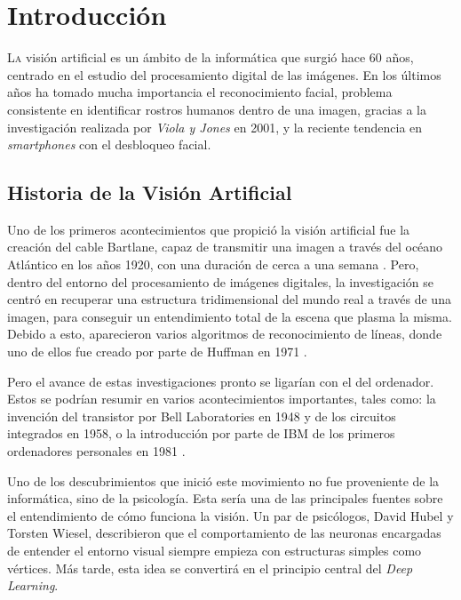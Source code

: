 
\chapter{Introducción}

\lettrine[lines=4]{L}{a} visión artificial  es un ámbito de la informática que surgió hace 60 años, centrado en el estudio del procesamiento digital de las imágenes. En los últimos años ha tomado mucha importancia el reconocimiento facial, problema consistente en identificar rostros humanos dentro de una imagen,  gracias a la investigación realizada por \textit{Viola y Jones} en 2001, y la reciente tendencia en \textit{smartphones} con el desbloqueo facial. 

\section{Historia de la Visión Artificial}

Uno de los primeros acontecimientos que propició la visión artificial fue la creación del cable Bartlane, capaz de transmitir una imagen a través del océano Atlántico en los años 1920, con una duración de cerca a una semana \cite{gonzalez_woods_2018}. Pero, dentro del entorno del procesamiento de imágenes digitales, la investigación se centró en recuperar una estructura tridimensional del mundo real a través de una imagen, para conseguir un entendimiento total de la escena que plasma la misma. Debido a esto, aparecieron varios algoritmos de reconocimiento de líneas, donde uno de ellos fue creado por parte de Huffman en 1971 \cite{szeliski_2018}.

Pero el avance de estas investigaciones pronto se ligarían con el del ordenador. Estos se podrían resumir en varios acontecimientos importantes, tales como: la invención del transistor por Bell Laboratories en 1948 y de los circuitos integrados en 1958, o la introducción por parte de IBM de los primeros ordenadores personales en 1981 \cite{gonzalez_woods_2018}.

Uno de los descubrimientos que inició este movimiento no fue proveniente de la informática, sino de la psicología. Esta sería una de las principales fuentes sobre el entendimiento de cómo funciona la visión.  Un par de psicólogos, David Hubel y Torsten Wiesel, describieron que el comportamiento de las neuronas encargadas de entender el entorno visual siempre empieza con estructuras simples como vértices. Más tarde, esta idea se convertirá en el principio central del \textit{Deep Learning}.


